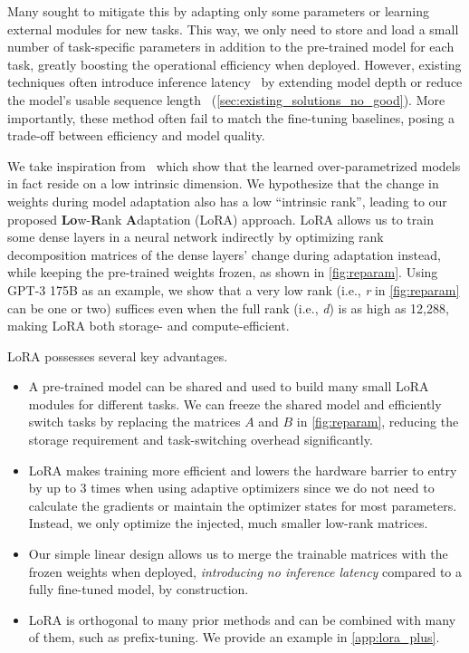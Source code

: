 Many sought to mitigate this by adapting only some parameters or learning external modules for new tasks. This way, we only need to store and load a small number of task-specific parameters in addition to the pre-trained model for each task, greatly boosting the operational efficiency when deployed. However, existing techniques often introduce inference latency~\citep{houlsby_parameter-efficient_2019, rebuffi_learning_2017} by extending model depth or reduce the model's usable sequence length~\citep{li_prefix-tuning_2021, lester_power_2021, hambardzumyan_warp_2020, liu_gpt_2021} (\autoref{sec:existing_solutions_no_good}).
More importantly, these method often fail to match the fine-tuning baselines, posing a trade-off between efficiency and model quality.

We take inspiration from~\cite{li_measuring_2018, aghajanyan_intrinsic_2020} which show that the learned over-parametrized models in fact reside on a low intrinsic dimension. We hypothesize that the change in weights during model adaptation also has a low ``intrinsic rank'', leading to our proposed \textbf{Lo}w-\textbf{R}ank \textbf{A}daptation (LoRA) approach. LoRA allows us to train some dense layers in a neural network indirectly by optimizing rank decomposition matrices of the dense layers' change during adaptation instead, while keeping the pre-trained weights frozen, as shown in \autoref{fig:reparam}.
Using GPT-3 175B as an example, we show that a very low rank (i.e., \textit{r} in \autoref{fig:reparam} can be one or two) suffices even when the full rank (i.e., \textit{d}) is as high as 12,288, making LoRA both storage- and compute-efficient.

LoRA possesses several key advantages.

\begin{itemize}[topsep=6pt,itemsep=3pt,partopsep=4pt, parsep=4pt]
\item
A pre-trained model can be shared and used to build many small LoRA modules for different tasks. We can freeze the shared model and efficiently switch tasks by replacing the matrices $A$ and $B$ in \autoref{fig:reparam}, reducing the storage requirement and task-switching overhead significantly.

\item
LoRA makes training more efficient and lowers the hardware barrier to entry by up to 3 times when using adaptive optimizers since we do not need to calculate the gradients or maintain the optimizer states for most parameters. Instead, we only optimize the injected, much smaller low-rank matrices.

\item
Our simple linear design allows us to merge the trainable matrices with the frozen weights when deployed, \textit{introducing no inference latency} compared to a fully fine-tuned model, by construction.

\item
LoRA is orthogonal to many prior methods and can be combined with many of them, such as prefix-tuning. We provide an example in \autoref{app:lora_plus}.

\end{itemize}

